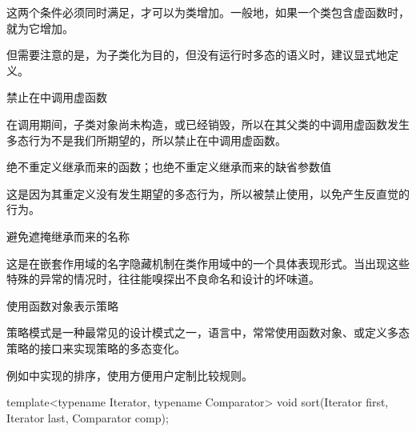\begin{content}
这两个条件必须同时满足，才可以为类增加。一般地，如果一个类包含虚函数时，就为它增加。

但需要注意的是，为子类化为目的，但没有运行时多态的语义时，建议显式地定义。

\begin{regulation}
禁止在中调用虚函数
\end{regulation}

在调用期间，子类对象尚未构造，或已经销毁，所以在其父类的中调用虚函数发生多态行为不是我们所期望的，所以禁止在中调用虚函数。

\begin{regulation}
绝不重定义继承而来的函数；也绝不重定义继承而来的缺省参数值
\end{regulation}

这是因为其重定义没有发生期望的多态行为，所以被禁止使用，以免产生反直觉的行为。

\begin{regulation}
避免遮掩继承而来的名称
\end{regulation}

这是在嵌套作用域的名字隐藏机制在类作用域中的一个具体表现形式。当出现这些特殊的异常的情况时，往往能嗅探出不良命名和设计的坏味道。

\begin{regulation}
使用函数对象表示策略
\end{regulation}

策略模式是一种最常见的设计模式之一，\cpp{}语言中，常常使用函数对象、或定义多态策略的接口来实现策略的多态变化。

例如中实现的排序，使用方便用户定制比较规则。

\begin{leftbar}
\begin{c++}[caption={标准库std::sort}]
template<typename Iterator, typename Comparator>
void sort(Iterator first, Iterator last, Comparator comp);
\end{c++}
\end{leftbar}

\end{content}
